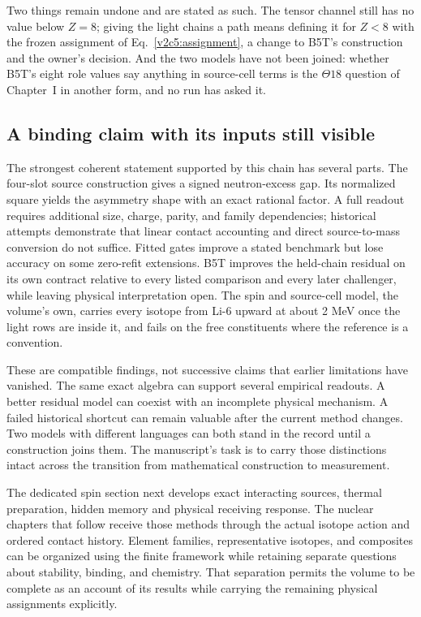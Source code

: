 Two things remain undone and are stated as such. The tensor channel still has no value below $Z=8$; giving the light chains a path means defining it for $Z<8$ with the frozen assignment of Eq.~\eqref{v2c5:assignment}, a change to B5T's construction and the owner's decision. And the two models have not been joined: whether B5T's eight role values say anything in source-cell terms is the $\Theta18$ question of Chapter~I in another form, and no run has asked it.

\subsection{A binding claim with its inputs still visible}
\label{v2c5:conclusion}

The strongest coherent statement supported by this chain has several parts. The four-slot source construction gives a signed neutron-excess gap. Its normalized square yields the asymmetry shape with an exact rational factor. A full readout requires additional size, charge, parity, and family dependencies; historical attempts demonstrate that linear contact accounting and direct source-to-mass conversion do not suffice. Fitted gates improve a stated benchmark but lose accuracy on some zero-refit extensions. B5T improves the held-chain residual on its own contract relative to every listed comparison and every later challenger, while leaving physical interpretation open. The spin and source-cell model, the volume's own, carries every isotope from Li-6 upward at about 2 MeV once the light rows are inside it, and fails on the free constituents where the reference is a convention.

These are compatible findings, not successive claims that earlier limitations have vanished. The same exact algebra can support several empirical readouts. A better residual model can coexist with an incomplete physical mechanism. A failed historical shortcut can remain valuable after the current method changes. Two models with different languages can both stand in the record until a construction joins them. The manuscript's task is to carry those distinctions intact across the transition from mathematical construction to measurement.

The dedicated spin section next develops exact interacting sources, thermal preparation, hidden memory and physical receiving response. The nuclear chapters that follow receive those methods through the actual isotope action and ordered contact history. Element families, representative isotopes, and composites can be organized using the finite framework while retaining separate questions about stability, binding, and chemistry. That separation permits the volume to be complete as an account of its results while carrying the remaining physical assignments explicitly.
